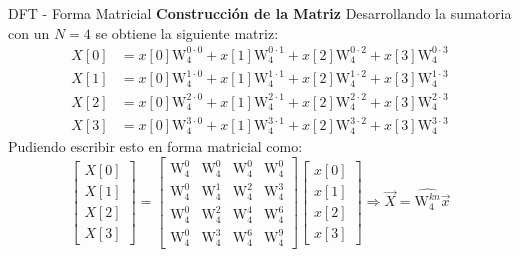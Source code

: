 \documentclass[aspectratio=169]{beamer}
\begin{document}
\begin{frame}{DFT - Forma Matricial}
\textbf{Construcción de la Matriz}
Desarrollando la sumatoria con un $N=4$ se obtiene la siguiente matriz:
$$
\begin{aligned}
    X[0] &= x[0] \text{W}_4^{0\cdot0} + x[1] \text{W}_4^{0\cdot1} + x[2] \text{W}_4^{0\cdot2} + x[3] \text{W}_4^{0\cdot3} \\
    X[1] &= x[0] \text{W}_4^{1\cdot0} + x[1] \text{W}_4^{1\cdot1} + x[2] \text{W}_4^{1\cdot2} + x[3] \text{W}_4^{1\cdot3} \\    
    X[2] &= x[0] \text{W}_4^{2\cdot0} + x[1] \text{W}_4^{2\cdot1} + x[2] \text{W}_4^{2\cdot2} + x[3] \text{W}_4^{2\cdot3} \\
    X[3] &= x[0] \text{W}_4^{3\cdot0} + x[1] \text{W}_4^{3\cdot1} + x[2] \text{W}_4^{3\cdot2} + x[3] \text{W}_4^{3\cdot3}
\end{aligned}
$$
Pudiendo escribir esto en forma matricial como:
$$
\begin{bmatrix}
X[0] \\
X[1] \\
X[2] \\
X[3]
\end{bmatrix}
=
\begin{bmatrix}       
\text{W}_4^{0} & \text{W}_4^{0} & \text{W}_4^{0} & \text{W}_4^{0} \\
\text{W}_4^{0} & \text{W}_4^{1} & \text{W}_4^{2} & \text{W}_4^{3} \\
\text{W}_4^{0} & \text{W}_4^{2} & \text{W}_4^{4} & \text{W}_4^{6} \\
\text{W}_4^{0} & \text{W}_4^{3} & \text{W}_4^{6} & \text{W}_4^{9}
\end{bmatrix}
\begin{bmatrix}
x[0] \\
x[1] \\
x[2] \\
x[3]
\end{bmatrix}
\Rightarrow \vec{X}=\widehat{\text{W}^{kn}_4} \vec{x}
$$

\end{frame}
\end{document}
